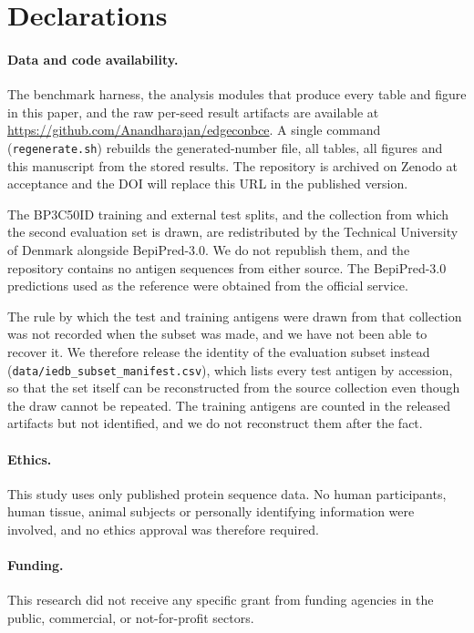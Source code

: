\section*{Declarations}

\paragraph{Data and code availability.} The benchmark harness, the analysis
modules that produce every table and figure in this paper, and the raw
per-seed result artifacts are available at
\url{https://github.com/Anandharajan/edgeconbce}. A single command
(\texttt{regenerate.sh}) rebuilds the generated-number file, all tables, all
figures and this manuscript from the stored results. The repository is
archived on Zenodo at acceptance and the DOI will replace this URL in the
published version.

The BP3C50ID training and external test splits, and the
\texttt{\IedbSourceFile{}} collection from which the second evaluation set is
drawn, are redistributed by the Technical University of Denmark alongside
BepiPred-3.0. We do not republish them, and the repository contains no antigen
sequences from either source. The BepiPred-3.0 predictions used as the
reference were obtained from the official service.

The rule by which the \IedbSubsetTest{} test and \IedbSubsetTrain{} training
antigens were drawn from that collection was not recorded when the subset was
made, and we have not been able to recover it. We therefore release the
identity of the evaluation subset instead
(\texttt{data/iedb\_subset\_manifest.csv}), which lists every test antigen by
accession, so that the set itself can be reconstructed from the source
collection even though the draw cannot be repeated. The
\IedbSubsetTrain{} training antigens are counted in the released artifacts but
not identified, and we do not reconstruct them after the fact.

\paragraph{Ethics.} This study uses only published protein sequence data. No
human participants, human tissue, animal subjects or personally identifying
information were involved, and no ethics approval was therefore required.

\paragraph{Funding.} This research did not receive any specific grant from
funding agencies in the public, commercial, or not-for-profit sectors.

